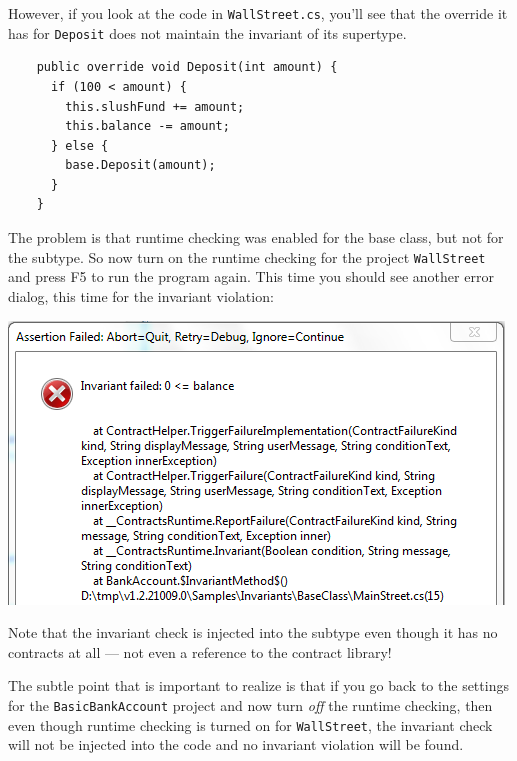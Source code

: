 \documentclass{article}
\newcommand{\code}[1]{\lstinline{#1}}
\begin{document}
However, if you look at the code in \code{WallStreet.cs}, you'll see that the override
it has for \code{Deposit} does not maintain the invariant of its supertype.
\begin{lstlisting}
    public override void Deposit(int amount) {
      if (100 < amount) {
        this.slushFund += amount;
        this.balance -= amount;
      } else {
        base.Deposit(amount);
      }
    }
\end{lstlisting}
The problem is that runtime checking was enabled for the base class, but not for the subtype.
So now turn on the runtime checking for the project \code{WallStreet} and press \textsf{F5}
to run the program again.
This time you should see another error dialog, this time for the invariant violation:
\begin{center}
  \includegraphics[width=1\columnwidth]{ex4.png}
\end{center}
Note that the invariant check is injected into the subtype even though it has no contracts
at all --- not even a reference to the contract library!

The subtle point that is important to realize is that if you go back to the settings for
the \code{BasicBankAccount} project and now turn {\em off} the runtime checking, then even
though runtime checking is turned on for \code{WallStreet}, the invariant check will not
be injected into the code and no invariant violation will be found.
\end{document}
